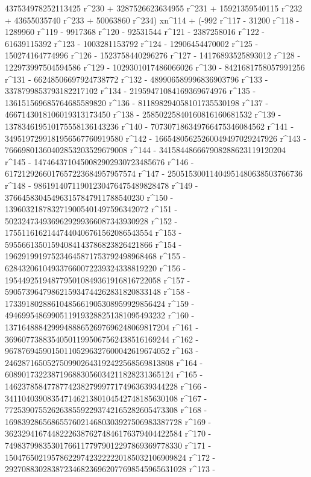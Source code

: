        437534978252113425 r^230 + 3287526623634955 r^231 + 
       15921359540115 r^232 + 43655035740 r^233 + 
       50063860 r^234) xn^114 + (-992 r^117 - 31200 r^118 - 
       1289960 r^119 - 9917368 r^120 - 92531544 r^121 - 
       2387258016 r^122 - 61639115392 r^123 - 1003281153792 r^124 - 
       12906454470002 r^125 - 150274164774996 r^126 - 
       1523758440296276 r^127 - 14176893525893012 r^128 - 
       122973997504594586 r^129 - 1029301017486066026 r^130 - 
       8421681758057991256 r^131 - 66248506697924738772 r^132 - 
       489906589996836903796 r^133 - 3378799853793182217102 r^134 - 
       21959471084169369674976 r^135 - 
       136151569685764685589820 r^136 - 
       811898294058101735530198 r^137 - 
       4667143018106019313173450 r^138 - 
       25850225840160816160681532 r^139 - 
       137834619510175558136143236 r^140 - 
       707307186349766475346084562 r^141 - 
       3495197299181956567760919580 r^142 - 
       16654805625260049497029247926 r^143 - 
       76669801360402853203529679008 r^144 - 
       341584486667908288623119120204 r^145 - 
       1474643710450082902930723485676 r^146 - 
       6172129266017657223684957957574 r^147 - 
       25051530011404951480638503766736 r^148 - 
       98619140711901230476475489828478 r^149 - 
       376645830454963157847911788540230 r^150 - 
       1396032187832719005401497596342072 r^151 - 
       5023247349369629299366087343930928 r^152 - 
       17551161621447440406761562086543554 r^153 - 
       59556613501594084143786823826421866 r^154 - 
       196291991975234645871753792498968468 r^155 - 
       628432061049337660072239324338819220 r^156 - 
       1954492519487795010849361916816722058 r^157 - 
       5905739647986215934744262831820833148 r^158 - 
       17339180288610485661905308959929856424 r^159 - 
       49469954869905119193288251381095493232 r^160 - 
       137164888429994888652697696248069817204 r^161 - 
       369607738835405011995067562438516169244 r^162 - 
       967876945901501105296327600042619674052 r^163 - 
       2462871650527509902643192422568569813808 r^164 - 
       6089017322387196883056034211828231365124 r^165 - 
       14623785847787742382799977174963639344228 r^166 - 
       34110403908354714621380104542748185630108 r^167 - 
       77253907552626385592293742165282605473308 r^168 - 
       169839286568655760214680303927506983387728 r^169 - 
       362329416744822263876274846176379404422584 r^170 - 
       749837998353017661177979012297869369778330 r^171 - 
       1504765021957862297423222220185032106909824 r^172 - 
       2927088302838723468236962077698545965631028 r^173 - 
